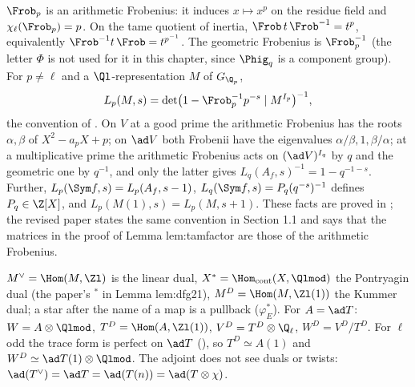 \begin{sloppypar}
\begin{convention}\label{conv:paper:frobenius}
$\Frob_p$ is an arithmetic Frobenius: it induces $x\mapsto x^p$ on the residue field and $\chi_\ell(\Frob_p)=p$. On the tame quotient of inertia,
$\Frob\, t\,\Frob^{-1}=t^p$, equivalently $\Frob^{-1}t\,\Frob=t^{p^{-1}}$. The geometric Frobenius is $\Frob_p^{-1}$ (the letter $\Phi$ is not used for it in this
chapter, since $\Phig_q$ is a component group). For $p\ne\ell$ and a $\Ql$-representation $M$ of $G_{\Q_p}$,
\[
L_p(M,s)=\det\bigl(1-\Frob_p^{-1}p^{-s}\mid M^{I_p}\bigr)^{-1},
\]
the convention of \cite[Sections 1.1.1, 1.7.2]{DFG04}. On $V$ at a good prime the arithmetic Frobenius has the roots $\alpha,\beta$ of $X^2-a_pX+p$; on $\ad V$ both
Frobenii have the eigenvalues $\alpha/\beta,1,\beta/\alpha$; at a multiplicative prime the arithmetic Frobenius acts on $(\ad V)^{I_q}$ by $q$ and the geometric one by $q^{-1}$,
and only the latter gives $L_q(A_f,s)^{-1}=1-q^{-1-s}$. Further, $L_p(\Sym f,s)=L_p(A_f,s-1)$, $L_q(\Sym f,s)=P_q(q^{-s})^{-1}$ defines $P_q\in\Z[X]$, and
$L_p(M(1),s)=L_p(M,s+1)$. These facts are proved in ; the revised paper states the same convention in Section 1.1 and says that the
matrices in the proof of Lemma lem:tamfactor are those of the arithmetic Frobenius.
\end{convention}

\begin{convention}[duals]\label{conv:paper:duals}
$M^\vee=\Hom(M,\Zl)$ is the linear dual, $X^*=\Hom_{\mathrm{cont}}(X,\Qlmod)$ the Pontryagin dual (the paper's ${}^*$ in Lemma lem:dfg21), $M^D=\Hom(M,\Zl(1))$ the Kummer
dual; a star after the name of a map is a pullback ($\varphi_E^*$). For $A=\ad T$: $W=A\otimes\Qlmod$, $T^D=\Hom(A,\Zl(1))$, $V^D=T^D\otimes\Q_\ell$, $W^D=V^D/T^D$. For $\ell$
odd the trace form is perfect on $\ad T$ (), so $T^D\simeq A(1)$ and $W^D\simeq\ad T(1)\otimes\Qlmod$. The adjoint does not see duals or twists:
$\ad(T^\vee)=\ad T=\ad(T(n))=\ad(T\otimes\chi)$.
\end{convention}


\end{sloppypar}
